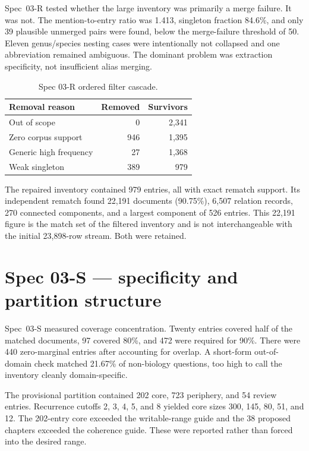 \documentclass[11pt]{article}
\begin{document}
Spec~03-R tested whether the large inventory was primarily a merge failure. It
was not. The mention-to-entry ratio was 1.413, singleton fraction 84.6\%, and
only 39 plausible unmerged pairs were found, below the merge-failure threshold
of 50. Eleven genus/species nesting cases were intentionally not collapsed and
one abbreviation remained ambiguous. The dominant problem was extraction
specificity, not insufficient alias merging.

\begin{table}[h]
\centering
\begin{tabular}{lrr}
\toprule
Removal reason & Removed & Survivors \\
\midrule
Out of scope & 0 & 2,341 \\
Zero corpus support & 946 & 1,395 \\
Generic high frequency & 27 & 1,368 \\
Weak singleton & 389 & 979 \\
\bottomrule
\end{tabular}
\caption{Spec 03-R ordered filter cascade.}
\end{table}

The repaired inventory contained 979 entries, all with exact rematch support.
Its independent rematch found 22,191 documents (90.75\%), 6,507 relation
records, 270 connected components, and a largest component of 526 entries. This
22,191 figure is the match set of the filtered inventory and is not
interchangeable with the initial 23,898-row stream. Both were retained.

\section{Spec 03-S --- specificity and partition structure}

Spec~03-S measured coverage concentration. Twenty entries covered half of the
matched documents, 97 covered 80\%, and 472 were required for 90\%. There were
440 zero-marginal entries after accounting for overlap. A short-form
out-of-domain check matched 21.67\% of non-biology questions, too high to call
the inventory cleanly domain-specific.

The provisional partition contained 202 core, 723 periphery, and 54 review
entries. Recurrence cutoffs 2, 3, 4, 5, and 8 yielded core sizes 300, 145, 80,
51, and 12. The 202-entry core exceeded the writable-range guide and the 38
proposed chapters exceeded the coherence guide. These were reported rather than
forced into the desired range.
\end{document}

